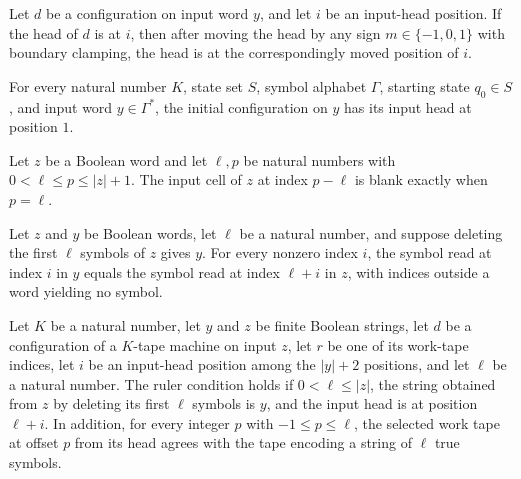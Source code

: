 \begin{theorem}
\label{Turing.NativeAt.move}
\leanok
{}
Let $d$ be a configuration on input word $y$, and let $i$ be an input-head position. If
the head of $d$ is at $i$, then after moving the head by any sign $m\in\{-1,0,1\}$ with
boundary clamping, the head is at the correspondingly moved position of $i$.
\end{theorem}

\begin{theorem}
\label{Turing.nativeAt_init}
\leanok
{}
For every natural number $K$, state set $S$, symbol alphabet $\Gamma$, starting state
$q_0\in S$, and input word $y\in\Gamma^*$, the initial configuration on $y$ has its
input head at position $1$.
\end{theorem}

\begin{theorem}
\label{Turing.inputCell_sub_eq_none_iff}
\leanok
{}
Let $z$ be a Boolean word and let $\ell,p$ be natural numbers with $0<\ell\le p\le
|z|+1$. The input cell of $z$ at index $p-\ell$ is blank exactly when $p=\ell$.
\end{theorem}

\begin{theorem}
\label{Turing.inputCell_of_drop}
\leanok
{}
Let $z$ and $y$ be Boolean words, let $\ell$ be a natural number, and suppose deleting
the first $\ell$ symbols of $z$ gives $y$. For every nonzero index $i$, the symbol read
at index $i$ in $y$ equals the symbol read at index $\ell+i$ in $z$, with indices
outside a word yielding no symbol.
\end{theorem}

\begin{definition}
\label{Turing.RulerAt}
\leanok
{}
Let $K$ be a natural number, let $y$ and $z$ be finite Boolean strings, let $d$ be a
configuration of a $K$-tape machine on input $z$, let $r$ be one of its work-tape
indices, let $i$ be an input-head position among the $|y|+2$ positions, and let $\ell$ be a
natural number. The ruler condition holds if $0<\ell\le |z|$, the string obtained from $z$
by deleting its first $\ell$ symbols is $y$, and the input head is at position $\ell+i$. In
addition, for every integer $p$ with $-1\le p\le \ell$, the selected work tape at offset
$p$ from its head agrees with the tape encoding a string of $\ell$ true symbols.
\end{definition}

